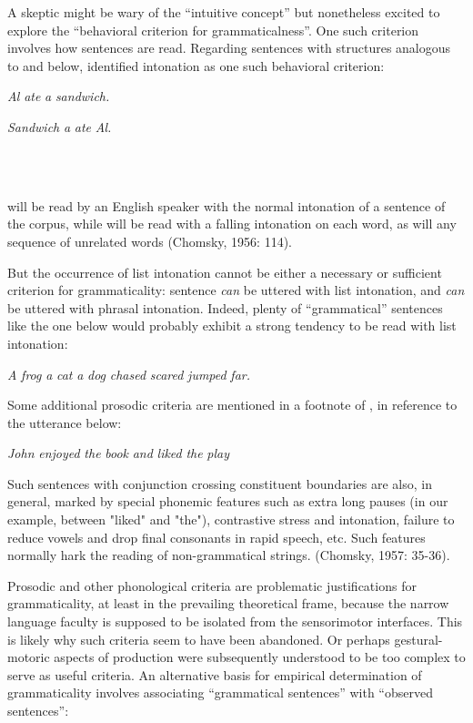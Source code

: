   A skeptic might be wary of the “intuitive concept” but nonetheless excited to explore the “behavioral criterion for grammaticalness”. One such criterion involves how sentences are read. Regarding sentences with structures analogous to  and  below, \citet{Chomsky1956} identified intonation as one such behavioral criterion:

   \textit{Al} \textit{ate} \textit{a} \textit{sandwich.}

   \textit{Sandwich} \textit{a} \textit{ate} \textit{Al.}

\ea%
    \label{ex:key:1}
    \gll\\
        \\
    \glt
    \z

         will be read by an English speaker with the normal intonation of a sentence of the corpus, while  will be read with a falling intonation on each word, as will any sequence of unrelated words (Chomsky, 1956: 114).

  But the occurrence of list intonation cannot be either a necessary or sufficient criterion for grammaticality: sentence  \textit{can} be uttered with list intonation, and  \textit{can} be uttered with phrasal intonation. Indeed, plenty of “grammatical” sentences like the one below would probably exhibit a strong tendency to be read with list intonation: 

\textit{A} \textit{frog} \textit{a} \textit{cat} \textit{a} \textit{dog} \textit{chased} \textit{scared} \textit{jumped} \textit{far.}

Some additional prosodic criteria are mentioned in a footnote of \citet{Chomsky1957}, in reference to the utterance below:

\textit{John} \textit{enjoyed} \textit{the} \textit{book} \textit{and} \textit{liked} \textit{the} \textit{play}

Such sentences with conjunction crossing constituent boundaries are also, in general, marked by special phonemic features such as extra long pauses (in our example, between "liked" and "the"), contrastive stress and intonation, failure to reduce vowels and drop final consonants in rapid speech, etc. Such features normally hark the reading of non-grammatical strings. (Chomsky, 1957: 35-36).

  Prosodic and other phonological criteria are problematic justifications for grammaticality, at least in the prevailing theoretical frame, because the narrow language faculty is supposed to be isolated from the sensorimotor interfaces. This is likely why such criteria seem to have been abandoned. Or perhaps gestural-motoric aspects of production were subsequently understood to be too complex to serve as useful criteria.   An alternative basis for empirical determination of grammaticality involves associating “grammatical sentences” with “observed sentences”:

